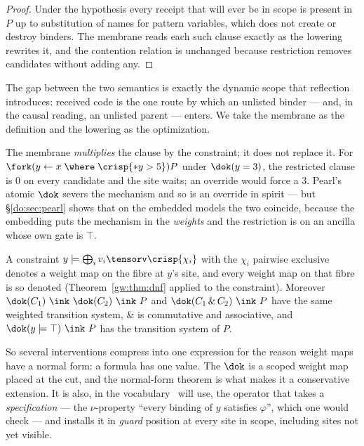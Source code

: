 \begin{proof}
Under the hypothesis every receipt that will ever be in scope is present in $P$ up to substitution
of names for pattern variables, which does not create or destroy binders. The membrane reads each
such clause exactly as the lowering rewrites it, and the contention relation is unchanged because
restriction removes candidates without adding any.
\end{proof}

The gap between the two semantics is exactly the dynamic scope that reflection introduces: received
code is the one route by which an unlisted binder --- and, in the causal reading, an unlisted
parent --- enters. We take the membrane as the definition and the lowering as the optimization.

\begin{observation}
\label{do:obs:restrict}
The membrane \emph{multiplies} the clause by the constraint; it does not replace it. For
$\fork(y \leftarrow x \;\where\; \crisp{*y > 5})P$ under $\dok(y = 3)$, the restricted clause is
$0$ on every candidate and the site waits; an override would force a $3$. Pearl's atomic $\dok$
severs the mechanism and so is an override in spirit --- but \S\ref{do:sec:pearl} shows that on the
embedded models the two coincide, because the embedding puts the mechanism in the \emph{weights}
and the restriction is on an ancilla whose own gate is $\top$.
\end{observation}

\begin{proposition}
\label{do:prop:dnf}
A constraint $y \models \bigoplus_i v_i \tensorv \crisp{\chi_i}$ with the $\chi_i$ pairwise
exclusive denotes a weight map on the fibre at $y$'s site, and every weight map on that fibre is
so denoted (Theorem~\ref{gw:thm:dnf} applied to the constraint). Moreover
$\dok(C_1)\ \ink\ \dok(C_2)\ \ink\ P$ and $\dok(C_1 \,\&\, C_2)\ \ink\ P$ have the same weighted
transition system, $\&$ is commutative and associative, and $\dok(y \models \top)\ \ink\ P$ has the
transition system of $P$.
\end{proposition}

So several interventions compress into one expression for the reason weight maps have a normal
form: a formula has one value. The $\dok$ is a scoped weight map placed at the cut, and the
normal-form theorem is what makes it a conservative extension. It is also, in the vocabulary
\chSci\ will use, the operator that takes a \emph{specification} --- the $\nu$-property ``every
binding of $y$ satisfies $\varphi$'', which one would check --- and installs it in \emph{guard}
position at every site in scope, including sites not yet visible.

